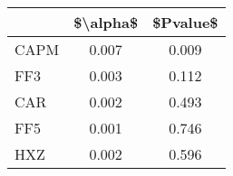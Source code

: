 \begin{tabular}{lcc}
\toprule
{} &  \$\textbackslash alpha\$ &  \$Pvalue\$ \\
\midrule
CAPM &     0.007 &     0.009 \\
FF3  &     0.003 &     0.112 \\
CAR  &     0.002 &     0.493 \\
FF5  &     0.001 &     0.746 \\
HXZ  &     0.002 &     0.596 \\
\bottomrule
\end{tabular}
